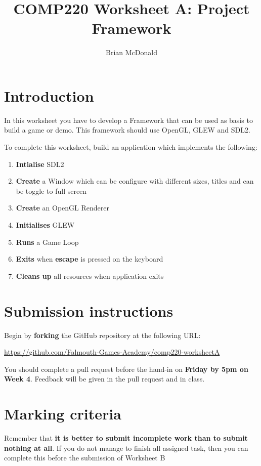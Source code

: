 \documentclass{../../../fal_assignment}
\title{COMP220 Worksheet A: Project Framework}
\author{Brian McDonald}
\begin{document}
\maketitle

\section*{Introduction}

In this worksheet you have to develop a Framework that can be used as basis to build a game or demo. This framework should use OpenGL, GLEW and SDL2.

To complete this worksheet, build an application which implements the following:
\begin{enumerate}[label=(\alph*)]
	\item \textbf{Intialise} SDL2
	\item \textbf{Create} a Window which can be configure with different sizes, titles and can be toggle to full screen
	\item \textbf{Create} an OpenGL Renderer
	\item \textbf{Initialises} GLEW
	\item \textbf{Runs} a Game Loop
	\item \textbf{Exits} when \textbf{escape} is pressed on the keyboard 
	\item \textbf{Cleans up} all resources when application exits
\end{enumerate}

\section*{Submission instructions}

Begin by \textbf{forking} the GitHub repository at the following URL:

\url{https://github.com/Falmouth-Games-Academy/comp220-worksheetA}

You should complete a pull request before the hand-in on \textbf{Friday by 5pm on Week 4}. Feedback will be given in the pull request and in class.

\section*{Marking criteria}

Remember that \textbf{it is better to submit incomplete work than to submit nothing at all}. If you do not manage to finish all assigned task, then you can complete this before the submission of Worksheet B
\end{document}
